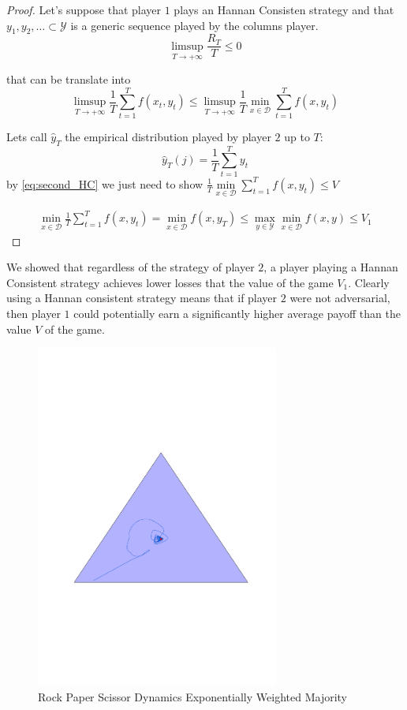 \begin{proof}
    Let's suppose that player $1$ plays an Hannan Consisten strategy and that $y_1,y_2,\ldots \subset \mathcal Y$ is a generic sequence played by the columns player.
    \begin{equation}
        \limsup\limits_{T\to+\infty}\frac{R_T}{T}\le0
    \end{equation}
    
    that can be translate into 
    \begin{equation}\label{eq:second_HC}
        \limsup\limits_{T\to+\infty}\frac{1}{T}\sum\limits_{t=1}^Tf(x_t,y_t)\le\limsup\limits_{T\to+\infty}\frac{1}{T}\min\limits_{x\in\mathcal D}\sum\limits_{t=1}^Tf(x,y_t)
    \end{equation}

    Lets call $\hat y_T$ the empirical distribution played by player $2$ up to $T$:
    $$\hat y_T(j)=\frac{1}{T}\sum\limits_{t=1}^Ty_t$$
    by \eqref{eq:second_HC} we just need to show $\frac{1}{T}\min\limits_{x\in \mathcal D} \sum\limits_{t=1}^T f(x,y_t)\le V$

    \begin{align}
        \min\limits_{x\in\mathcal D}\frac{1}{T}\sum\limits_{t=1}^T f(x,y_t)=\min\limits_{x\in\mathcal D} f(x,y_T)\le\max\limits_{y\in\mathcal Y}\min\limits_{x\in\mathcal D} f(x,y)\le V_1
    \end{align}
\end{proof}

We showed that regardless of the strategy of player $2$, a player playing a Hannan Consistent strategy achieves lower losses that the value of the game $V_1$. Clearly using a Hannan consistent strategy means that if player $2$ were not adversarial, then player $1$ could potentially earn a significantly higher average payoff than the value $V$ of the game.

\begin{figure}[t!]
    \centering
    \includegraphics[width=8cm]{./img/rps_ewm.pdf}
\caption{Rock Paper Scissor Dynamics Exponentially Weighted Majority}
\label{fig:OL}
\end{figure}


